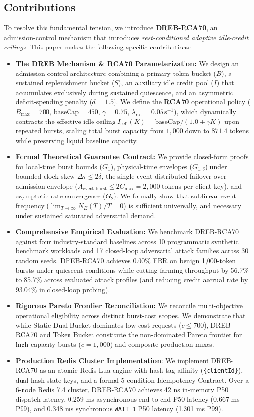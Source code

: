 \documentclass[conference]{IEEEtran}
\begin{document}
\subsection{Contributions}
To resolve this fundamental tension, we introduce \textbf{DREB-RCA70}, an admission-control mechanism that introduces \textit{rest-conditioned adaptive idle-credit ceilings}. This paper makes the following specific contributions:
\begin{itemize}
    \item \textbf{The DREB Mechanism \& RCA70 Parameterization:} We design an admission-control architecture combining a primary token bucket ($B$), a sustained replenishment bucket ($S$), an auxiliary idle credit pool ($I$) that accumulates exclusively during sustained quiescence, and an asymmetric deficit-spending penalty ($d=1.5$). We define the \textbf{RCA70} operational policy ($B_{\max} = 700$, $\text{baseCap} = 450$, $\gamma = 0.75$, $\lambda_{\text{rec}} = 0.05\,\text{s}^{-1}$), which dynamically contracts the effective idle ceiling $I_{\text{ceil}}(K) = \text{baseCap} / (1.0 + \gamma K)$ upon repeated bursts, scaling total burst capacity from $1,000$ down to $871.4$ tokens while preserving liquid baseline capacity.
    \item \textbf{Formal Theoretical Guarantee Contract:} We provide closed-form proofs for local-time burst bounds ($G_1$), physical-time envelopes ($G_{1,\delta}$) under bounded clock skew $\Delta \tau \le 2\delta$, the single-event distributed failover over-admission envelope ($A_{\text{event\_burst}} \le 2 C_{\max} = 2,000$ tokens per client key), and asymptotic rate convergence ($G_2$). We formally show that sublinear event frequency ($\lim_{T\to\infty} N_E(T)/T = 0$) is sufficient universally, and necessary under sustained saturated adversarial demand.
    \item \textbf{Comprehensive Empirical Evaluation:} We benchmark DREB-RCA70 against four industry-standard baselines across 10 programmatic synthetic benchmark workloads and 17 closed-loop adversarial attack families across 30 random seeds. DREB-RCA70 achieves 0.00\% FRR on benign 1,000-token bursts under quiescent conditions while cutting farming throughput by 56.7\% to 85.7\% across evaluated attack profiles (and reducing credit accrual rate by 93.04\% in closed-loop probing).
    \item \textbf{Rigorous Pareto Frontier Reconciliation:} We reconcile multi-objective operational eligibility across distinct burst-cost scopes. We demonstrate that while Static Dual-Bucket dominates low-cost requests ($c \le 700$), DREB-RCA70 and Token Bucket constitute the non-dominated Pareto frontier for high-capacity bursts ($c = 1,000$) and composite production mixes.
    \item \textbf{Production Redis Cluster Implementation:} We implement DREB-RCA70 as an atomic Redis Lua engine with hash-tag affinity (\texttt{\{clientId\}}), dual-hash state keys, and a formal 5-condition Idempotency Contract. Over a 6-node Redis 7.4 cluster, DREB-RCA70 achieves 42 ns in-memory P50 dispatch latency, 0.259 ms asynchronous end-to-end P50 latency (0.667 ms P99), and 0.348 ms synchronous \texttt{WAIT 1} P50 latency (1.301 ms P99).
\end{itemize}
\end{document}
